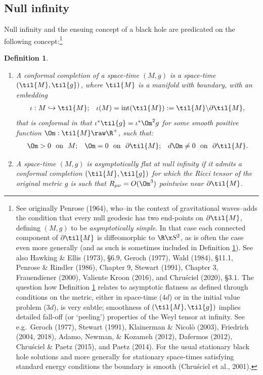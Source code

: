 \documentclass[11pt,a4paper]{article}
\newcommand{\p}{\partial}
\newtheorem{definition}[theorem]{Definition}
\begin{document}
\subsection{Null infinity}\label{ni}
Null infinity and the ensuing concept  of a black hole are predicated on the following concept:\footnote{\label{fn14} See originally Penrose (1964), who--in the context of gravitational waves--adds the condition that every null geodesic has two end-points on $\p\til{M}$, defining $(M,g)$ to be \emph{asymptotically simple}. In that case each connected component of $\p\til{M}$ is  diffeomorphic to $\R\x S^2$, as is often the case even more generally (and as such is sometimes included in Definition \ref{defAF}).
 See also Hawking \& Ellis (1973),  \S 6.9, Geroch (1977), Wald (1984), \S 11.1, Penrose \& Rindler (1986), Chapter 9, Stewart (1991), Chapter 3, Frauendiener (2000),  
 Valiente Kroon (2016), and Chru\'{s}ciel (2020), \S 3.1.
 The question how Definition \ref{defAF} relates to asymptotic flatness as defined through conditions on the metric, either in space-time ($4d$) or in the initial value problem ($3d$), is very subtle; smoothness of $(\til{M},\til{g})$ implies detailed fall-off (or `peeling') properties of the Weyl tensor at infinity. See e.g.\ 
  Geroch (1977),  Stewart (1991), Klainerman \& Nicol\`{o} (2003),  Friedrich (2004, 2018),
   Adamo, Newman, \& Kozameh (2012),  Dafermos (2012),  Chru\'{s}ciel \&  Paetz (2015), and Paetz (2014).
 For the usual  stationary black hole solutions  and more generally for stationary space-times satisfying standard energy conditions the boundary is smooth (Chru\'{s}ciel et al., 2001). }
\begin{definition}\label{defAF}
\begin{enumerate}
\item 
A \emph{conformal completion} of a  space-time $(M,g)$  is a  space-time $(\til{M},\til{g})$, where  $\til{M}$ is a
manifold with boundary,
 with an embedding 
 \begin{align}
 \iota:M\hookrightarrow \til{M}; &&\iota(M)=\mathrm{int}(\til{M}):=\til{M}\backslash \p\til{M},
 \end{align}
 that is \emph{conformal} in that $\iota^*\til{g}=\iota^*\Om^2g$ for some smooth positive function
  $\Om:\til{M}\raw\R^+$, such that:
    \begin{align}
\Om>0\:\:\: \mathrm{ on }\:\:\:  M; &&  \Om=0 \:\:\:\mathrm{ on } \:\:\:\p \til{M}; && d\Om\neq 0 \:\:\: \mathrm{ on } \:\:\:\p \til{M}.
\label{Om3}
\end{align}
\item  A space-time $(M,g)$ is \emph{asymptotically flat at null infinity} if it admits a conformal completion $(\til{M},\til{g})$ for which  the Ricci tensor of the original metric $g$ is such that $R_{\mu\nu}=O(\Om^3)$ pointwise near $\p\til{M}$.
\end{enumerate}
 \end{definition}
\end{document}

